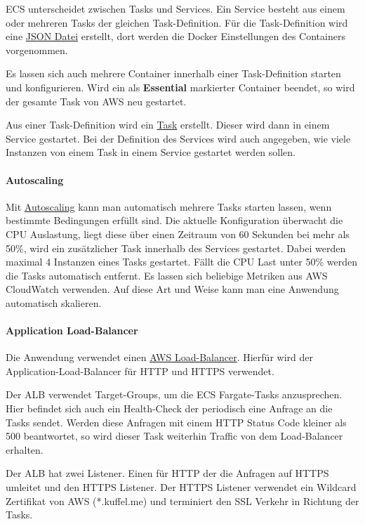 ECS unterscheidet zwischen Tasks und Services.
Ein Service besteht aus einem oder mehreren Tasks der gleichen Task-Definition.
Für die Task-Definition wird eine \hyperref[lst:terraform_ecs_task_json]{JSON Datei} erstellt, dort werden die Docker Einstellungen des Containers vorgenommen.

Es lassen sich auch mehrere Container innerhalb einer Task-Definition starten und konfigurieren.
Wird ein als \textbf{Essential} markierter Container beendet, so wird der gesamte Task von AWS neu gestartet.

Aus einer Task-Definition wird ein \hyperref[lst:terraform_ecs_task]{Task} erstellt.
Dieser wird dann in einem Service gestartet.
Bei der Definition des Services wird auch angegeben, wie viele Instanzen von einem Task in einem Service gestartet werden sollen.


\paragraph{Autoscaling}

Mit \hyperref[lst:terraform_autoscaling]{Autoscaling} kann man automatisch mehrere Tasks starten lassen, wenn bestimmte Bedingungen erfüllt sind.
Die aktuelle Konfiguration überwacht die CPU Auslastung, liegt diese über einen Zeitraum von 60 Sekunden bei mehr als 50\%, wird ein zusätzlicher Task innerhalb des Services gestartet.
Dabei werden maximal 4 Instanzen eines Tasks gestartet.
Fällt die CPU Last unter 50\% werden die Tasks automatisch entfernt.
Es lassen sich beliebige Metriken aus AWS CloudWatch verwenden.
Auf diese Art und Weise kann man eine Anwendung automatisch skalieren.

\paragraph{Application Load-Balancer}

Die Anwendung verwendet einen \hyperref[lst:terraform_alb]{AWS Load-Balancer}.
Hierfür wird der Application-Load-Balancer für HTTP und HTTPS verwendet.

Der ALB verwendet Target-Groups, um die ECS Fargate-Tasks anzusprechen.
Hier befindet sich auch ein Health-Check der periodisch eine Anfrage an die Tasks sendet.
Werden diese Anfragen mit einem HTTP Status Code kleiner als 500 beantwortet, so wird dieser Task weiterhin Traffic von dem Load-Balancer erhalten.

Der ALB hat zwei Listener.
Einen für HTTP der die Anfragen auf HTTPS umleitet und den HTTPS Listener.
Der HTTPS Listener verwendet ein Wildcard Zertifikat von AWS (*.kuffel.me) und terminiert den SSL Verkehr in Richtung der Tasks.


